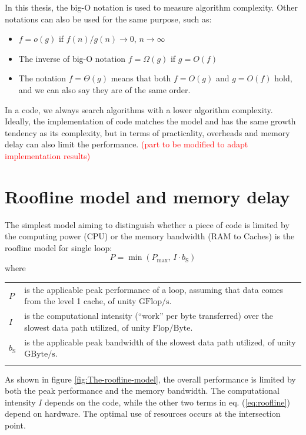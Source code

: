 In this thesis, the big-O notation is used to measure algorithm complexity.
Other notations can also be used for the same purpose, such as: 
\begin{itemize}
\item $f=o(g)$ if $f(n)/g(n)\rightarrow0$, $n\rightarrow\infty$
\item The inverse of big-O notation $f=\Omega(g)$ if $g=O(f)$
\item The notation $f=\Theta(g)$ means that both $f=O(g)$ and $g=O(f)$
hold, and we can also say they are of the same order.
\end{itemize}
In a code, we always search algorithms with a lower algorithm complexity.
Ideally, the implementation of code matches the model and has the
same growth tendency as its complexity, but in terms of practicality,
overheads and memory delay can also limit the performance. \textcolor{red}{(part
to be modified to adapt implementation results)}


\section{Roofline model and memory delay}

The simplest model aiming to distinguish whether a piece of code is
limited by the computing power (CPU) or the memory bandwidth (RAM
to Caches) is the roofline model \citep{Williams_2009_roofline} for
single loop:
\begin{equation}
P=\min\left(P_{\max},\,I\cdot b_{\mathrm{S}}\right)\label{eq:roofline}
\end{equation}
where

\begin{tabular}{l>{\raggedright}p{}}
$P$ & is the applicable peak performance of a loop, assuming that data comes
from the level 1 cache, of unity $\mathrm{GFlop/s}$. \tabularnewline
$I$ & is the computational intensity (“work” per byte transferred) over
the slowest data path utilized, of unity $\mathrm{Flop/Byte}$. \tabularnewline
$b_{\mathrm{S}}$ & is the applicable peak bandwidth of the slowest data path utilized,
of unity $\mathrm{GByte/s}$.\tabularnewline
 & \tabularnewline
\end{tabular}

As shown in figure \ref{fig:The-roofline-model}, the overall performance
is limited by both the peak performance and the memory bandwidth.
The computational intensity $I$ depends on the code, while the other
two terms in eq. (\ref{eq:roofline}) depend on hardware. The optimal
use of resources occurs at the intersection point.

